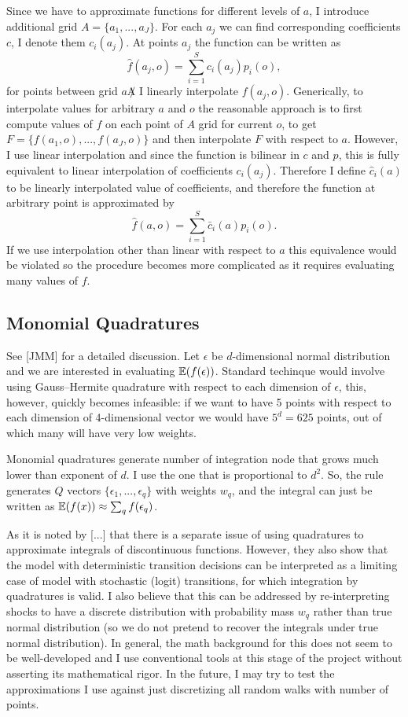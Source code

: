 Since we have to approximate functions for different levels of $a$, I introduce additional grid $A = \{a_1,...,a_J\}$. For each $a_j$ we can find corresponding coefficients $c$, I denote them $c_i(a_j)$. At points $a_j$ the function can be written as
\[\hat{f}(a_j,o) = \sum\limits_{i=1}^S c_i(a_j) p_i(o),\]
for points between grid $a \not A$ I linearly interpolate $f(a_j,o)$. Generically, to interpolate values for arbitrary $a$ and $o$ the  reasonable approach is to first compute values of $f$ on each point of $A$ grid for current $o$, to get $F = \{f(a_1,o),...,f(a_J,o)\}$ and then interpolate $F$ with respect to $a$. However, I use linear interpolation and since the function is bilinear in $c$ and $p$, this is fully equivalent to linear interpolation of coefficients $c_i(a_j)$. Therefore I define $\hat{c}_i(a)$ to be linearly interpolated value of coefficients, and therefore the function at arbitrary point is approximated by
\[\hat{f}(a,o) = \sum\limits_{i=1}^S \bar{c}_i(a) p_i(o).\]
If we use interpolation other than linear with respect to $a$ this equivalence would be violated so the procedure becomes more complicated as it requires evaluating many values of $f$.

\subsection{Monomial Quadratures}
See [JMM] for a detailed discussion. Let $\epsilon$ be $d$-dimensional normal distribution and we are interested in evaluating $\operatorname{\mathbb{E}}(f(\epsilon))$. Standard techinque would involve using Gauss--Hermite quadrature with respect to each dimension of $\epsilon$, this, however, quickly becomes infeasible: if we want to have 5 points with respect to each dimension of 4-dimensional vector we would have $5^d = 625$ points, out of which many will have very low weights. 

Monomial quadratures generate number of integration node that grows much lower than exponent of $d$. I use the one that is proportional to $d^2$. So, the rule generates $Q$ vectors $\{\epsilon_1,...,\epsilon_q\}$ with weights $w_q$, and the integral can just be written as $\operatorname{\mathbb{E}}(f(x))\approx \sum_{q} f(\epsilon_q)$.

As it is noted by [...] that there is a separate issue of using quadratures to approximate integrals of discontinuous functions. However, they also show that the model with deterministic transition decisions can be interpreted as a limiting case of model with stochastic (logit) transitions, for which integration by quadratures is valid. I also believe that this can be addressed by re-interpreting shocks to have a discrete distribution with probability mass $w_q$ rather than true normal distribution (so we do not pretend to recover the integrals under true normal distribution). In general, the math background for this does not seem to be well-developed and I use conventional tools at this stage of the project without asserting its mathematical rigor. In the future, I may try to test the approximations I use against just discretizing all random walks with number of points.

